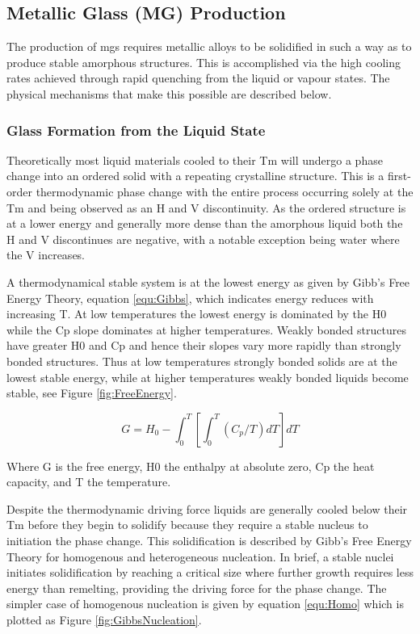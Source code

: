 \documentclass[a4paper,12pt,oneside]{report}%
\begin{document}
\subsection{Metallic Glass (MG) Production}
The production of \glspl{mg} requires metallic alloys to be solidified in such a way as to produce stable amorphous structures. This is accomplished via the high cooling rates achieved through rapid quenching from the liquid or vapour states. The physical mechanisms that make this possible are described below. 

\subsubsection{Glass Formation from the Liquid State} \label{sec:Gibbs}
Theoretically most liquid materials cooled to their \gls{Tm} will undergo a phase change into an ordered solid with a repeating crystalline structure. This is a first-order thermodynamic phase change with the entire process occurring solely at the \gls{Tm} and being observed as an \gls{H} and \gls{V} discontinuity. As the ordered structure is at a lower energy and generally more dense than the amorphous liquid both the \gls{H} and \gls{V} discontinues are negative, with a notable exception being water where the \gls{V} increases.
 
A thermodynamical stable system is at the lowest energy as given by Gibb's Free Energy Theory, equation \ref{equ:Gibbs}, which indicates energy reduces with increasing \gls{T}. At low temperatures the lowest energy is dominated by the \gls{H0} while the \gls{Cp} slope dominates at higher temperatures. Weakly bonded structures have greater \gls{H0} and \gls{Cp} and hence their slopes vary more rapidly than strongly bonded structures. Thus at low temperatures strongly bonded solids are at the lowest stable energy, while at higher temperatures weakly bonded liquids become stable, see Figure \ref{fig:FreeEnergy}. 

\begin{equation}
	G = H_{0}-\int_{0}^{T} 
	\left[
	\int_{0}^{T}(C_{p}/T) dT
	\right] dT
	\label{equ:Gibbs}
\end{equation}

Where \acrshort{G} is the free energy, \acrshort{H0} the enthalpy at absolute zero, \acrshort{Cp} the heat capacity, and \acrshort{T} the temperature. 

Despite the thermodynamic driving force liquids are generally cooled below their \gls{Tm} before they begin to solidify because they require a stable nucleus to initiation the phase change. This solidification is described by Gibb's Free Energy Theory for homogenous and heterogeneous nucleation. In brief, a stable nuclei initiates solidification by reaching a critical size where further growth requires less energy than remelting, providing the driving force for the phase change. The simpler case of homogenous nucleation is given by equation \ref{equ:Homo} which is plotted as Figure \ref{fig:GibbsNucleation}. 
\end{document}
